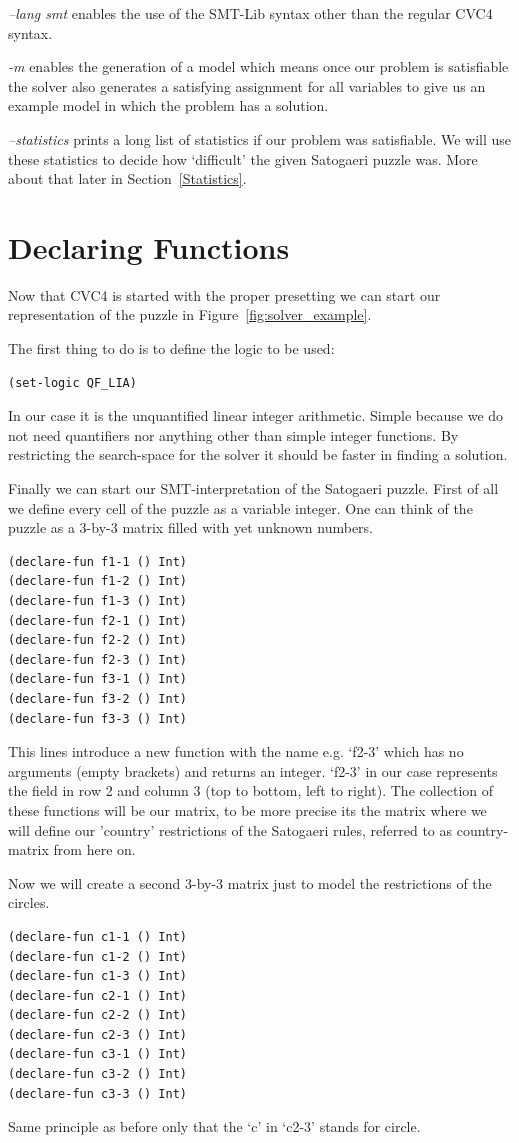 \emph{--lang smt} enables the use of the SMT-Lib syntax other than the regular CVC4 syntax.

\emph{-m} enables the generation of a model which means once our problem is satisfiable the solver also generates a satisfying assignment for all variables to give us an example model in which the problem has a solution.

\emph{--statistics} prints a long list of statistics if our problem was satisfiable. We will use these statistics to decide how `difficult' the given Satogaeri puzzle was. More about that later in Section~\ref{Statistics}. 

\section{Declaring Functions}
Now that CVC4 is started with the proper presetting we can start our representation of the puzzle in Figure~\ref{fig:solver_example}.

The first thing to do is to define the logic to be used:
\begin{lstlisting}
(set-logic QF_LIA)
\end{lstlisting}
In our case it is the unquantified linear integer arithmetic. Simple because we do not need quantifiers nor anything other than simple integer functions. By restricting the search-space for the solver it should be faster in finding a solution.

Finally we can start our SMT-interpretation of the Satogaeri puzzle. First of all we define every cell of the puzzle as a variable integer. One can think of the puzzle as a 3-by-3 matrix filled with yet unknown numbers.
\begin{lstlisting}
(declare-fun f1-1 () Int)
(declare-fun f1-2 () Int)
(declare-fun f1-3 () Int)
(declare-fun f2-1 () Int)
(declare-fun f2-2 () Int)
(declare-fun f2-3 () Int)
(declare-fun f3-1 () Int)
(declare-fun f3-2 () Int)
(declare-fun f3-3 () Int)
\end{lstlisting}
This lines introduce a new function with the name e.g. `f2-3' which has no arguments (empty brackets) and returns an integer. `f2-3' in our case represents the field in row 2 and column 3 (top to bottom, left to right). The collection of these functions will be our matrix, to be more precise its the matrix where we will define our 'country' restrictions of the Satogaeri rules, referred to as country-matrix from here on.

Now we will create a second 3-by-3 matrix just to model the restrictions of the circles.
\begin{lstlisting}
(declare-fun c1-1 () Int)
(declare-fun c1-2 () Int)
(declare-fun c1-3 () Int)
(declare-fun c2-1 () Int)
(declare-fun c2-2 () Int)
(declare-fun c2-3 () Int)
(declare-fun c3-1 () Int)
(declare-fun c3-2 () Int)
(declare-fun c3-3 () Int)
\end{lstlisting}
Same principle as before only that the `c' in `c2-3' stands for circle.


